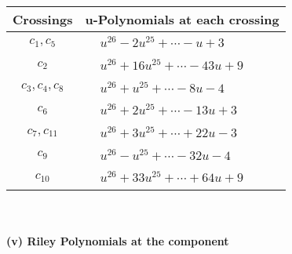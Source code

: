 \documentclass[1p]{elsarticle_modified}
\theoremstyle{definition}
\begin{document}
\begin{tabular}{m{50pt}|m{274pt}}
Crossings & \hspace{64pt}u-Polynomials at each crossing \\
\hline $$\begin{aligned}c_{1},c_{5}\end{aligned}$$&$\begin{aligned}
&u^{26}-2 u^{25}+\cdots- u+3
\end{aligned}$\\
\hline $$\begin{aligned}c_{2}\end{aligned}$$&$\begin{aligned}
&u^{26}+16 u^{25}+\cdots-43 u+9
\end{aligned}$\\
\hline $$\begin{aligned}c_{3},c_{4},c_{8}\end{aligned}$$&$\begin{aligned}
&u^{26}+u^{25}+\cdots-8 u-4
\end{aligned}$\\
\hline $$\begin{aligned}c_{6}\end{aligned}$$&$\begin{aligned}
&u^{26}+2 u^{25}+\cdots-13 u+3
\end{aligned}$\\
\hline $$\begin{aligned}c_{7},c_{11}\end{aligned}$$&$\begin{aligned}
&u^{26}+3 u^{25}+\cdots+22 u-3
\end{aligned}$\\
\hline $$\begin{aligned}c_{9}\end{aligned}$$&$\begin{aligned}
&u^{26}- u^{25}+\cdots-32 u-4
\end{aligned}$\\
\hline $$\begin{aligned}c_{10}\end{aligned}$$&$\begin{aligned}
&u^{26}+33 u^{25}+\cdots+64 u+9
\end{aligned}$\\
\hline
\end{tabular}\\~\\
\newpage\renewcommand{\arraystretch}{1}
\flushleft \textbf{(v) Riley Polynomials at the component}\newline \\
\end{document}
